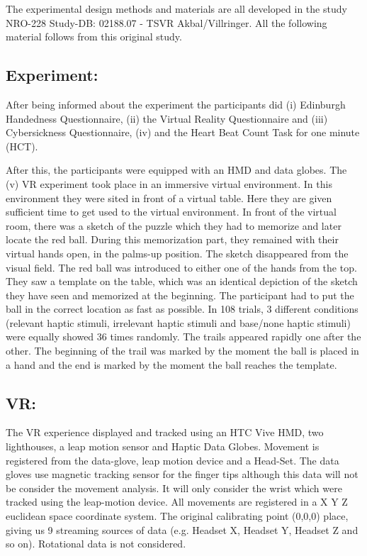 \documentclass{article}
\begin{document}
The experimental design methods and materials are all developed in the study NRO-228 Study-DB: 02188.07 - TSVR Akbal/Villringer. All the following material follows from this original study.

\subsection{Experiment:}

After being informed about the experiment the participants did (i) Edinburgh Handedness Questionnaire, (ii) the Virtual Reality Questionnaire and (iii) Cybersickness Questionnaire, (iv) and the Heart Beat Count Task for one minute (HCT). 

After this, the participants were equipped with an HMD and data globes. The (v) VR experiment took place in an immersive virtual environment. In this environment they were sited in front of a virtual table. Here they are given sufficient time to get used to the virtual environment. In front of the virtual room, there was a sketch of the puzzle which they had to memorize and later locate the red ball. During this memorization part, they remained with their virtual hands open, in the palms-up position. The sketch disappeared from the visual field. The red ball was introduced to either one of the hands from the top. They saw a template on the table, which was an identical depiction of the sketch they have seen and memorized at the beginning. The participant had to put the ball in the correct location as fast as possible. In 108 trials, 3 different conditions (relevant haptic stimuli, irrelevant haptic stimuli and base/none haptic stimuli) were equally showed 36 times randomly. The trails appeared rapidly one after the other. The beginning  of the trail was marked by the moment the ball is placed in a hand and the end is marked by the moment the ball reaches the template.

\subsection{VR:} The VR experience displayed and tracked using an HTC Vive HMD, two lighthouses, a leap motion sensor and Haptic Data Globes. Movement is registered from the data-glove, leap motion device and a Head-Set. The data gloves use magnetic tracking sensor for the finger tips although this data will not be consider the movement analysis. It will only consider the wrist which were tracked using the leap-motion device. All movements are registered in a X Y Z euclidean space coordinate system. The original calibrating point (0,0,0) place, giving us 9 streaming sources of data (e.g. Headset X, Headset Y, Headset Z and so on). Rotational data is not considered. 
\end{document}
